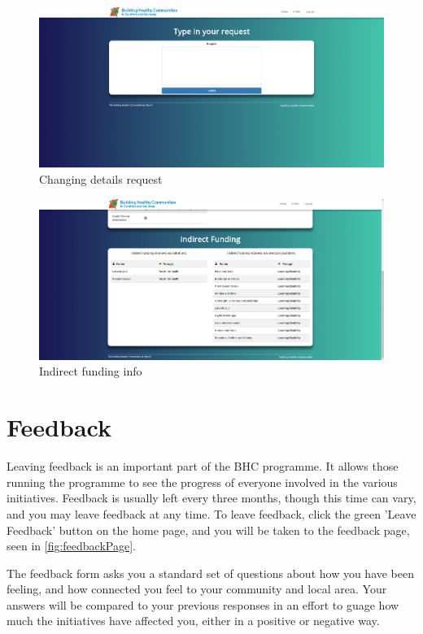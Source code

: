 \documentclass{bhcguides}
\begin{document}
\begin{figure}[h]
 \centerline{\includegraphics[width=\textwidth, height=\textheight, keepaspectratio]{detailchange.png}}
 \caption{Changing details request}
 \label{fig:detailChange}
\end{figure}

\begin{figure}[h]
 \centerline{\includegraphics[width=\textwidth, height=\textheight, keepaspectratio]{fundinginfo.png}}
 \caption{Indirect funding info}
 \label{fig:fundingInfo}
\end{figure}

\section{Feedback}
\label{sec:feedback}

Leaving feedback is an important part of the BHC programme. It allows those running the programme to see the progress of everyone involved in the various initiatives. Feedback is usually left every three months, though this time can vary, and you may leave feedback at any time. To leave feedback, click the green 'Leave Feedback' button on the home page, and you will be taken to the feedback page, seen in \autoref{fig:feedbackPage}.

The feedback form asks you a standard set of questions about how you have been feeling, and how connected you feel to your community and local area. Your answers will be compared to your previous responses in an effort to guage how much the initiatives have affected you, either in a positive or negative way.
\end{document}
